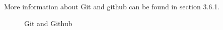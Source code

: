 More information about Git and github can be found in section 3.6.1.

\begin{figure}[H]
	\centering
	\caption{Git and Github}
\end{figure}
